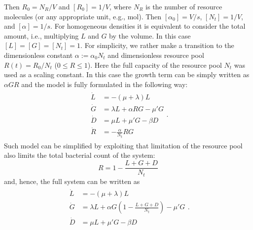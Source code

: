 \documentclass[10pt,A4paper]{article}
\numberwithin{equation}{section}
\begin{document}
Then $R_0=N_R/V$ and $[R_0]=1/V$, where $N_R$ is the number of resource molecules (or any appropriate unit, e.g., mol).
Then $[\alpha_0]=V/s$, $[N_t]=1/V$, and $[\alpha]=1/s$.
For homogeneous densities it is equivalent to consider the total amount, i.e., multiplying $L$ and $G$ by the volume.
In this case $[L]=[G]=[N_t]=1$.
For simplicity, we rather make a transition to the dimensionless constant $\alpha:=\alpha_0 N_t$ and dimensionless resource pool $R(t) = R_0 / N_t$ ($0 \leqslant R \leqslant 1$).
Here the full capacity of the resource pool $N_t$ was used as a scaling constant.
In this case the growth term can be simply written as $\alpha G R$ and the model is fully formulated in the following way:
\begin{align}
    \begin{split}
        \dot{L} &= -(\mu + \lambda) L\\
        \dot{G} &= \lambda L + \alpha R G-\mu' G\\
        \dot{D} &= \mu  L + \mu' G- \beta D\\
        \dot{R} &= - \frac{\alpha}{N_t} R G
    \end{split}.
\label{eq:ode_3pool_resource} 
\end{align}
%
Such model can be simplified by exploiting that limitation of the resource pool also limits the total bacterial count of the system:
\begin{equation}
    R = 1 - \frac{L+G+D}{N_t}
\end{equation}
and, hence, the full system can be written as
\begin{align}
    \begin{split}
        \dot{L} &= -(\mu + \lambda) L\\
        \dot{G} &= \lambda L + \alpha G\left(1-\frac{L+G+D}{N_t}\right)-\mu' G\\
        \dot{D} &= \mu  L + \mu' G- \beta D 
    \end{split}.
\label{eq:ode_3pool_resource2} 
\end{align}
%
%
\end{document}
